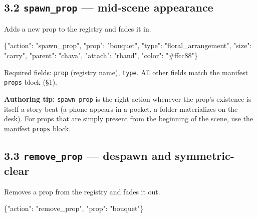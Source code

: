 \documentclass[
  12pt,
  letterpaper,
]{book}
\newenvironment{Shaded}{}{}
\newcommand{\DataTypeTok}[1]{\textcolor[rgb]{0.56,0.13,0.00}{#1}}
\newcommand{\FunctionTok}[1]{\textcolor[rgb]{0.02,0.16,0.49}{#1}}
\newcommand{\StringTok}[1]{\textcolor[rgb]{0.25,0.44,0.63}{#1}}
\begin{document}
\subsection{\texorpdfstring{3.2 \texttt{spawn\_prop} --- mid-scene
appearance}{3.2 spawn\_prop --- mid-scene appearance}}\label{spawn_prop-mid-scene-appearance}

Adds a new prop to the registry and fades it in.

\begin{Shaded}
\begin{Highlighting}[]
\FunctionTok{\{}\DataTypeTok{"action"}\FunctionTok{:} \StringTok{"spawn\_prop"}\FunctionTok{,} \DataTypeTok{"prop"}\FunctionTok{:} \StringTok{"bouquet"}\FunctionTok{,}
 \DataTypeTok{"type"}\FunctionTok{:} \StringTok{"floral\_arrangement"}\FunctionTok{,} \DataTypeTok{"size"}\FunctionTok{:} \StringTok{"carry"}\FunctionTok{,}
 \DataTypeTok{"parent"}\FunctionTok{:} \StringTok{"chava"}\FunctionTok{,} \DataTypeTok{"attach"}\FunctionTok{:} \StringTok{"rhand"}\FunctionTok{,}
 \DataTypeTok{"color"}\FunctionTok{:} \StringTok{"\#ffcc88"}\FunctionTok{\}}
\end{Highlighting}
\end{Shaded}

Required fields: \texttt{prop} (registry name), \texttt{type}. All other
fields match the manifest \texttt{props} block (§1).

\textbf{Authoring tip:} \texttt{spawn\_prop} is the right action
whenever the prop's existence is itself a story beat (a phone appears in
a pocket, a folder materializes on the desk). For props that are simply
present from the beginning of the scene, use the manifest \texttt{props}
block.

\subsection{\texorpdfstring{3.3 \texttt{remove\_prop} --- despawn and
symmetric-clear}{3.3 remove\_prop --- despawn and symmetric-clear}}\label{remove_prop-despawn-and-symmetric-clear}

Removes a prop from the registry and fades it out.

\begin{Shaded}
\begin{Highlighting}[]
\FunctionTok{\{}\DataTypeTok{"action"}\FunctionTok{:} \StringTok{"remove\_prop"}\FunctionTok{,} \DataTypeTok{"prop"}\FunctionTok{:} \StringTok{"bouquet"}\FunctionTok{\}}
\end{Highlighting}
\end{Shaded}
\end{document}
